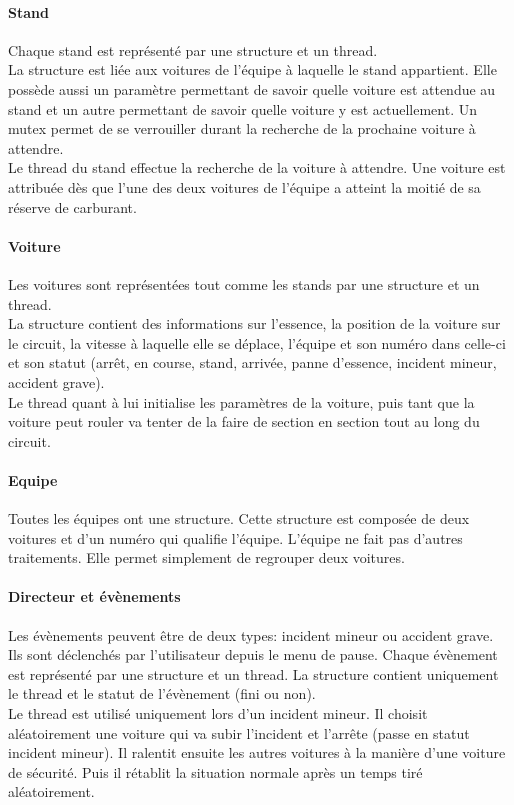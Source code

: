 \documentclass[a4paper, 11pt]{report}
\begin{document}
			\paragraph{Stand}
			
			Chaque stand est représenté par une structure et un thread. \\
			La structure est liée aux voitures de l'équipe à laquelle le stand appartient. Elle possède aussi un paramètre permettant de savoir quelle voiture est attendue au stand et un autre permettant de savoir quelle voiture y est actuellement. Un mutex permet de se verrouiller durant la recherche de la prochaine voiture à attendre. \\
			Le thread du stand effectue la recherche de la voiture à attendre. Une voiture est attribuée dès que l'une des deux voitures de l'équipe a atteint la moitié de sa réserve de carburant.
			
			
			\paragraph{Voiture}
			
			Les voitures sont représentées tout comme les stands par une structure et un thread. \\
			La structure contient des informations sur l'essence, la position de la voiture sur le circuit, la vitesse à laquelle elle se déplace, l'équipe et son numéro dans celle-ci et son statut (arrêt, en course, stand, arrivée, panne d'essence, incident mineur, accident grave).\\
			Le thread quant à lui initialise les paramètres de la voiture, puis tant que la voiture peut rouler va tenter de la faire de section en section tout au long du circuit.
			
			\paragraph{Equipe}
			
			Toutes les équipes ont une structure. Cette structure est composée de deux voitures et d'un numéro qui qualifie l'équipe. L'équipe ne fait pas d'autres traitements. Elle permet simplement de regrouper deux voitures.
			
			\paragraph{Directeur et évènements}
			
			Les évènements peuvent être de deux types: incident mineur ou accident grave. Ils sont déclenchés par l'utilisateur depuis le menu de pause. Chaque évènement est représenté par une structure et un thread. La structure contient uniquement le thread et le statut de l'évènement (fini ou non).\\
			 Le thread est utilisé uniquement lors d'un incident mineur. Il choisit aléatoirement une voiture qui va subir l'incident et l'arrête (passe en statut incident mineur). Il ralentit ensuite les autres voitures à la manière d'une voiture de sécurité. Puis il rétablit la situation normale après un temps tiré aléatoirement.\\
			 
\end{document}
